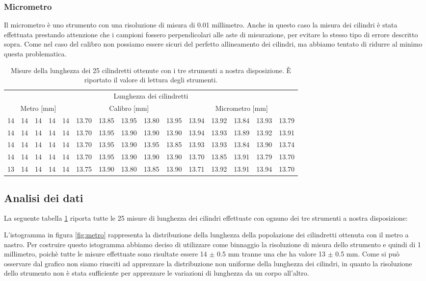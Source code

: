 \subsubsection{Micrometro}
Il micrometro è uno strumento con una risoluzione di misura di 0.01
millimetro. Anche in questo caso la misura dei cilindri è stata effettuata
prestando attenzione che i campioni fossero perpendicolari alle aste di
misurazione, per evitare lo stesso tipo di errore descritto sopra.
Come nel caso del calibro non possiamo essere sicuri del perfetto
allineamento dei cilindri, ma abbiamo tentato di ridurre al minimo
questa problematica.

\begin{table}[tb]
	\footnotesize
	\centering
	\begin{tabular} { c c c c c | c c c c c | c c c c c }
		\toprule
		\multicolumn{15}{c}{Lunghezza dei cilindretti} \\
		\multicolumn{5}{c}{Metro [mm]} & \multicolumn{5}{c}{Calibro [mm]} & \multicolumn{5}{c}{Micrometro [mm]} \\
		\midrule
		14 & 14 & 14 & 14 & 14 & 13.70 & 13.85 & 13.95 & 13.80 & 13.95 & 13.94 & 13.92 & 13.84 & 13.93 & 13.79 \\
		14 & 14 & 14 & 14 & 14 & 13.70 & 13.95 & 13.90 & 13.90 & 13.90 & 13.94 & 13.93 & 13.89 & 13.92 & 13.91 \\
		14 & 14 & 14 & 14 & 14 & 13.70 & 13.95 & 13.90 & 13.95 & 13.85 & 13.93 & 13.93 & 13.84 & 13.90 & 13.74 \\
		14 & 14 & 14 & 14 & 14 & 13.70 & 13.95 & 13.90 & 13.90 & 13.90 & 13.70 & 13.85 & 13.91 & 13.79 & 13.70 \\
		13 & 14 & 14 & 14 & 14 & 13.75 & 13.90 & 13.80 & 13.85 & 13.90 & 13.71 & 13.92 & 13.91 & 13.94 & 13.70 \\
	\bottomrule
	\end{tabular}
	\caption{Misure della lunghezza dei 25 cilindretti ottenute con i tre strumenti a nostra disposizione.
        È riportato il valore di lettura degli strumenti.}
	\label{tab:cilindretti}
\end{table}

\subsection{Analisi dei dati}
La seguente tabella \ref{tab:cilindretti} riporta tutte le 25 misure di
lunghezza dei cilindri effettuate con ognuno dei tre strumenti a nostra
disposizione:

L'istogramma in figura \ref{fig:metro} rappresenta la distribuzione della lunghezza della
popolazione dei cilindretti ottenuta con il metro a nastro. Per costruire
questo istogramma abbiamo deciso di utilizzare come binnaggio la risoluzione
di misura dello strumento e quindi di 1 millimetro, poichè tutte le misure
effettuate sono risultate essere 14 $\pm$ 0.5 mm tranne una che ha valore
13 $\pm$ 0.5 mm. Come si può osservare dal grafico non siamo riusciti ad
apprezzare la distribuzione non uniforme della lunghezza dei cilindri,
in quanto la risoluzione dello strumento non è stata sufficiente per
apprezzare le variazioni di lunghezza da un corpo all'altro.

